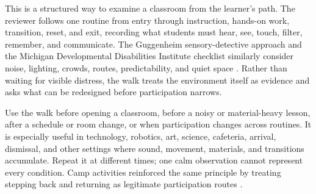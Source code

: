 \renewcommand{\sourcebox}[1]{%
  \vspace{0.06in}
  \noindent{\small\color{DeepNavy}\textbf{Key sources.} #1}
}


\vspace{-0.5cm}

This is a structured way to examine a classroom from the learner's path. The reviewer follows one routine from entry through instruction, hands-on work, transition, reset, and exit, recording what students must hear, see, touch, filter, remember, and communicate. The Guggenheim sensory-detective approach and the Michigan Developmental Disabilities Institute checklist similarly consider noise, lighting, crowds, routes, predictability, and quiet space \citep{guggenheimSensory,michigan2025sensory}. Rather than waiting for visible distress, the walk treats the environment itself as evidence and asks what can be redesigned before participation narrows.


Use the walk before opening a classroom, before a noisy or material-heavy lesson, after a schedule or room change, or when participation changes across routines. It is especially useful in technology, robotics, art, science, cafeteria, arrival, dismissal, and other settings where sound, movement, materials, and transitions accumulate. Repeat it at different times; one calm observation cannot represent every condition. Camp activities reinforced the same principle by treating stepping back and returning as legitimate participation routes \citep{campEvidence2026}.


